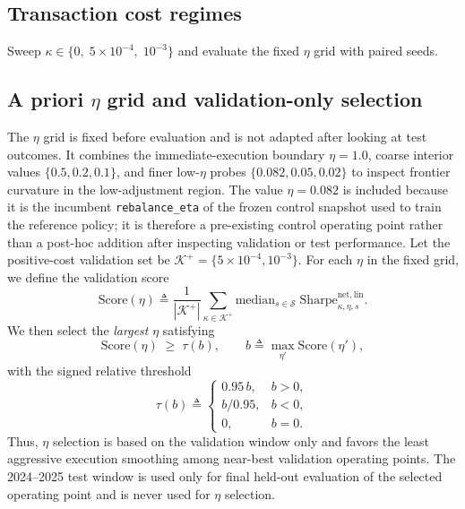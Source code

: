 \documentclass[10pt,twocolumn]{article}
\newcommand{\kappaTC}{\kappa}
\begin{document}
\subsection{Transaction cost regimes}
Sweep $\kappaTC\in\{0,\;5\times10^{-4},\;10^{-3}\}$ and evaluate the fixed $\eta$ grid with paired seeds.

\subsection{A priori \texorpdfstring{$\eta$}{eta} grid and validation-only selection}
\label{sec:validation_selection}
The $\eta$ grid is fixed before evaluation and is not adapted after looking at test outcomes. It combines the immediate-execution boundary $\eta=1.0$, coarse interior values $\{0.5,0.2,0.1\}$, and finer low-$\eta$ probes $\{0.082,0.05,0.02\}$ to inspect frontier curvature in the low-adjustment region. The value $\eta=0.082$ is included because it is the incumbent \texttt{rebalance\_eta} of the frozen control snapshot used to train the reference policy; it is therefore a pre-existing control operating point rather than a post-hoc addition after inspecting validation or test performance. Let the positive-cost validation set be $\mathcal{K}^{+}=\{5\times10^{-4},10^{-3}\}$. For each $\eta$ in the fixed grid, we define the validation score
\[
\mathrm{Score}(\eta)\triangleq \frac{1}{|\mathcal{K}^{+}|}\sum_{\kappa\in\mathcal{K}^{+}}\mathrm{median}_{s\in\mathcal{S}}\;\mathrm{Sharpe}^{\mathrm{net,lin}}_{\kappa,\eta,s}.
\]
We then select the \emph{largest} $\eta$ satisfying
\[
\mathrm{Score}(\eta)\;\ge\;\tau(b),\qquad
b\triangleq \max_{\eta'} \mathrm{Score}(\eta'),
\]
with the signed relative threshold
\[
\tau(b)\triangleq
\begin{cases}
0.95\,b, & b>0,\\
b/0.95, & b<0,\\
0, & b=0.
\end{cases}
\]
Thus, $\eta$ selection is based on the validation window only and favors the least aggressive execution smoothing among near-best validation operating points. The 2024--2025 test window is used only for final held-out evaluation of the selected operating point and is never used for $\eta$ selection.
\end{document}
